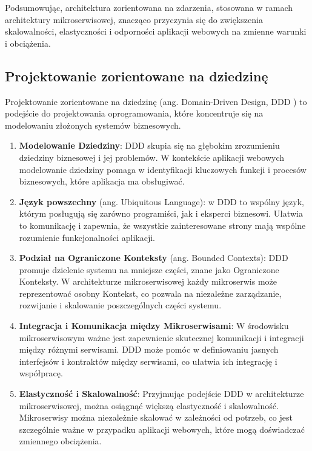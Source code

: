 Podsumowując, architektura zorientowana na zdarzenia, stosowana w ramach architektury mikroserwisowej, znacząco przyczynia się do zwiększenia skalowalności, elastyczności i odporności aplikacji webowych na zmienne warunki i obciążenia.

\subsection{Projektowanie zorientowane na dziedzinę}

Projektowanie zorientowane na dziedzinę (ang. Domain-Driven Design, DDD \cite{ddd}) to podejście do projektowania oprogramowania, które koncentruje się na modelowaniu złożonych systemów biznesowych.

\begin{enumerate}
    \item \textbf{Modelowanie Dziedziny}: DDD skupia się na głębokim zrozumieniu dziedziny biznesowej i jej problemów. W kontekście aplikacji webowych modelowanie dziedziny pomaga w identyfikacji kluczowych funkcji i procesów biznesowych, które aplikacja ma obsługiwać.

    \item \textbf{Język powszechny} (ang. Ubiquitous Language): w DDD to wspólny język, którym posługują się zarówno programiści, jak i eksperci biznesowi. Ułatwia to komunikację i zapewnia, że wszystkie zainteresowane strony mają wspólne rozumienie funkcjonalności aplikacji.

    \item \textbf{Podział na Ograniczone Konteksty }(ang. Bounded Contexts): DDD promuje dzielenie systemu na mniejsze części, znane jako Ograniczone Konteksty. W architekturze mikroserwisowej każdy mikroserwis może reprezentować osobny Kontekst, co pozwala na niezależne zarządzanie, rozwijanie i skalowanie poszczególnych części systemu.

    \item \textbf{Integracja i Komunikacja między Mikroserwisami}: W środowisku mikroserwisowym ważne jest zapewnienie skutecznej komunikacji i integracji między różnymi serwisami. DDD może pomóc w definiowaniu jasnych interfejsów i kontraktów między serwisami, co ułatwia ich integrację i współpracę.

    \item \textbf{Elastyczność i Skalowalność}: Przyjmując podejście DDD w architekturze mikroserwisowej, można osiągnąć większą elastyczność i skalowalność. Mikroserwisy można niezależnie skalować w zależności od potrzeb, co jest szczególnie ważne w przypadku aplikacji webowych, które mogą doświadczać zmiennego obciążenia.


\end{enumerate}
